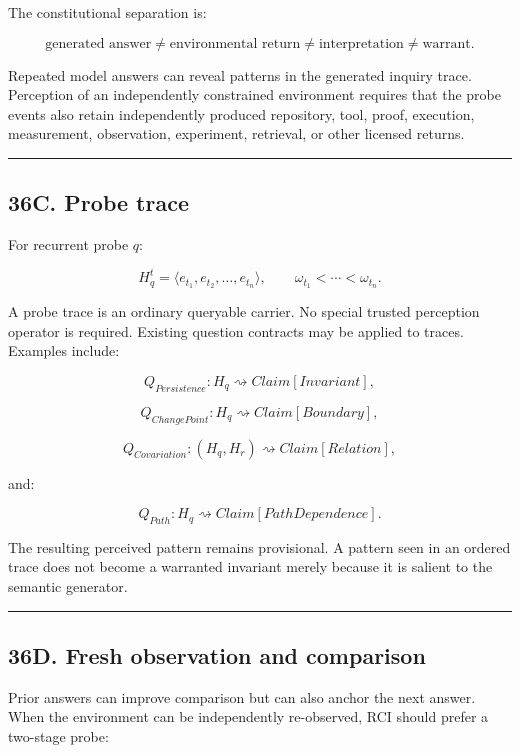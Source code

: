 \documentclass[
]{article}
\begin{document}
The constitutional separation is:

\[
\boxed{
\text{generated answer}
\neq
\text{environmental return}
\neq
\text{interpretation}
\neq
\text{warrant}.
}
\]

Repeated model answers can reveal patterns in the generated inquiry trace.
Perception of an independently constrained environment requires that the probe
events also retain independently produced repository, tool, proof, execution,
measurement, observation, experiment, retrieval, or other licensed returns.

\begin{center}\rule{0.5\linewidth}{0.5pt}\end{center}

\subsection{36C. Probe trace}\label{probe-trace}

For recurrent probe \(q\):

\[
\boxed{
H_q^t
=
\langle e_{t_1},e_{t_2},\ldots,e_{t_n}\rangle,
\qquad
\omega_{t_1}<\cdots<\omega_{t_n}.
}
\]

A probe trace is an ordinary queryable carrier. No special trusted perception
operator is required. Existing question contracts may be applied to traces.
Examples include:

\[
Q_{Persistence}:H_q\rightsquigarrow Claim[Invariant],
\]

\[
Q_{ChangePoint}:H_q\rightsquigarrow Claim[Boundary],
\]

\[
Q_{Covariation}:(H_q,H_r)\rightsquigarrow Claim[Relation],
\]

and:

\[
Q_{Path}:H_q\rightsquigarrow Claim[PathDependence].
\]

The resulting perceived pattern remains provisional. A pattern seen in an
ordered trace does not become a warranted invariant merely because it is
salient to the semantic generator.

\begin{center}\rule{0.5\linewidth}{0.5pt}\end{center}

\subsection{36D. Fresh observation and comparison}\label{fresh-observation-and-comparison}

Prior answers can improve comparison but can also anchor the next answer. When
the environment can be independently re-observed, RCI should prefer a two-stage
probe:
\end{document}
